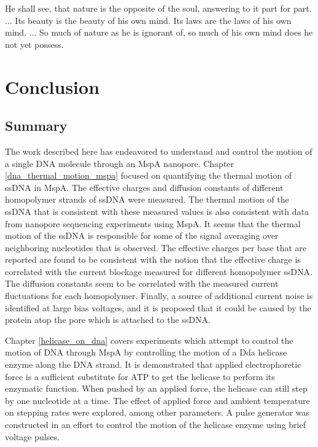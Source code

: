 \begin{savequote}[75mm]
He shall see, that nature is the opposite of the soul, answering to it part for part. ... Its beauty is the beauty of his own mind. Its laws are the laws of his own mind. ... So much of nature as he is ignorant of, so much of his own mind does he not yet possess.
\end{savequote}

\chapter{Conclusion}
\label{conclusion}

\section{Summary}

The work described here has endeavored to understand and control the motion of a single DNA molecule through an MspA nanopore.  Chapter \ref{dna_thermal_motion_mspa} focused on quantifying the thermal motion of ssDNA in MspA.  The effective charges and diffusion constants of different homopolymer strands of ssDNA were measured.  The thermal motion of the ssDNA that is consistent with these measured values is also consistent with data from nanopore sequencing experiments using MspA.  It seems that the thermal motion of the ssDNA is responsible for some of the signal averaging over neighboring nucleotides that is observed.  The effective charges per base that are reported are found to be consistent with the notion that the effective charge is correlated with the current blockage measured for different homopolymer ssDNA.  The diffusion constants seem to be correlated with the measured current fluctuations for each homopolymer.  Finally, a source of additional current noise is identified at large bias voltages, and it is proposed that it could be caused by the protein atop the pore which is attached to the ssDNA.

Chapter \ref{helicase_on_dna} covers experiments which attempt to control the motion of DNA through MspA by controlling the motion of a Dda helicase enzyme along the DNA strand.  It is demonstrated that applied electrophoretic force is a sufficient substitute for ATP to get the helicase to perform its enzymatic function.  When pushed by an applied force, the helicase can still step by one nucleotide at a time.  The effect of applied force and ambient temperature on stepping rates were explored, among other parameters.  A pulse generator was constructed in an effort to control the motion of the helicase enzyme using brief voltage pulses.

